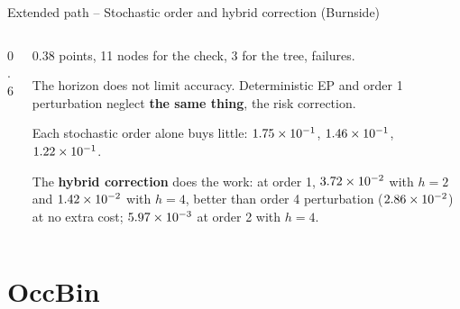 \documentclass[11pt,aspectratio=169]{beamer}
\begin{document}
\begin{frame}{Extended path -- Stochastic order and hybrid correction (Burnside)}

\begin{columns}[T]
\begin{column}{0.6\textwidth}
\begin{center}
\scriptsize
\renewcommand{\arraystretch}{1.05}
\setlength{\tabcolsep}{3pt}

\end{center}
\end{column}
\begin{column}{0.38\textwidth}
\small
\epBurnsidePoints{} points, 11 nodes for the check, 3 for the tree, \epbFailures{} failures.

\medskip
The horizon does not limit accuracy. Deterministic EP and order 1 perturbation neglect \textbf{the same thing}, the risk correction.

\medskip
Each stochastic order alone buys little: $1.75\times10^{-1}$, $1.46\times10^{-1}$, $1.22\times10^{-1}$.

\medskip
The \textbf{hybrid correction} does the work: at order 1, $3.72\times10^{-2}$ with $h=2$ and $1.42\times10^{-2}$ with $h=4$, better than order 4 perturbation ($2.86\times10^{-2}$) at no extra cost; $5.97\times10^{-3}$ at order 2 with $h=4$.
\end{column}
\end{columns}

\end{frame}

\section{OccBin}
\end{document}
